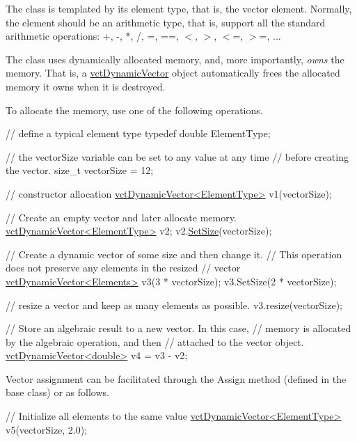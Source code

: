 \begin{DoxyEnumerate}
\item The class is templated by its element type, that is, the vector element. Normally, the element should be an arithmetic type, that is, support all the standard arithmetic operations\+: +, -\/, $\ast$, /, =, ==, $<$, $>$, $<$=, $>$=, ... 
\item The class uses dynamically allocated memory, and, more importantly, {\itshape owns} the memory. That is, a \hyperlink{classvct_dynamic_vector}{vct\+Dynamic\+Vector} object automatically frees the allocated memory it owns when it is destroyed. 
\item To allocate the memory, use one of the following operations. 
\begin{DoxyCode}
\textcolor{comment}{// define a typical element type}
\textcolor{keyword}{typedef} \textcolor{keywordtype}{double} ElementType;

\textcolor{comment}{// the vectorSize variable can be set to any value at any time}
\textcolor{comment}{// before creating the vector.}
\textcolor{keywordtype}{size\_t} vectorSize = 12;

\textcolor{comment}{// constructor allocation}
\hyperlink{classvct_dynamic_vector}{vctDynamicVector<ElementType>} v1(vectorSize);

\textcolor{comment}{// Create an empty vector and later allocate memory.}
\hyperlink{classvct_dynamic_vector}{vctDynamicVector<ElementType>} v2;
v2.\hyperlink{classvct_dynamic_vector_ad48b540760581f3c6b7beeb19e6220f2}{SetSize}(vectorSize);

\textcolor{comment}{// Create a dynamic vector of some size and then change it.}
\textcolor{comment}{// This operation does not preserve any elements in the resized}
\textcolor{comment}{// vector}
\hyperlink{classvct_dynamic_vector}{vctDynamicVector<Elements>} v3(3 * vectorSize);
v3.SetSize(2 * vectorSize);

\textcolor{comment}{// resize a vector and keep as many elements as possible.}
v3.resize(vectorSize);

\textcolor{comment}{// Store an algebraic result to a new vector.  In this case,}
\textcolor{comment}{// memory is allocated by the algebraic operation, and then}
\textcolor{comment}{// attached to the vector object.}
\hyperlink{classvct_dynamic_vector}{vctDynamicVector<double>} v4 = v3 - v2;
\end{DoxyCode}
 
\item Vector assignment can be facilitated through the Assign method (defined in the base class) or as follows. 
\begin{DoxyCode}
\textcolor{comment}{// Initialize all elements to the same value}
\hyperlink{classvct_dynamic_vector}{vctDynamicVector<ElementType>} v5(vectorSize, 2.0);


\end{DoxyCode}
\end{DoxyEnumerate}
